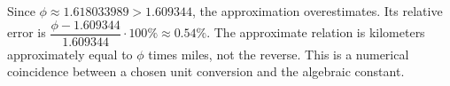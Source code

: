 Since $\phi\approx1.618033989>1.609344$, the approximation overestimates. Its relative error is $\dfrac{\phi-1.609344}{1.609344}\cdot100\%\approx\boxed{0.54\%}$. The approximate relation is kilometers approximately equal to $\phi$ times miles, not the reverse. This is a numerical coincidence between a chosen unit conversion and the algebraic constant.
